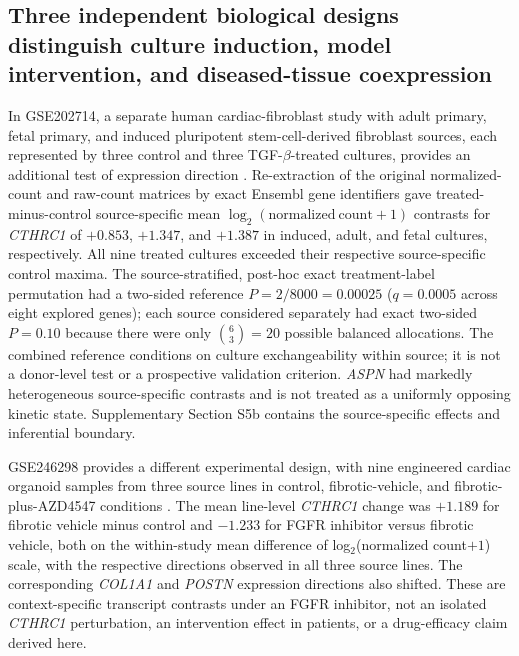 \documentclass[preprint,11pt]{elsarticle}
\newcommand{\cthrc}{\textit{CTHRC1}}
\begin{document}
\subsection{Three independent biological designs distinguish culture induction, model intervention, and diseased-tissue coexpression}
In GSE202714, a separate human cardiac-fibroblast study with adult primary, fetal primary, and induced pluripotent stem-cell-derived fibroblast sources, each represented by three control and three TGF-$\beta$-treated cultures, provides an additional test of expression direction \cite{Moita2022}. Re-extraction of the original normalized-count and raw-count matrices by exact Ensembl gene identifiers gave treated-minus-control source-specific mean \(\log_2(\mathrm{normalized\ count}+1)\) contrasts for \cthrc{} of $+0.853$, $+1.347$, and $+1.387$ in induced, adult, and fetal cultures, respectively. All nine treated cultures exceeded their respective source-specific control maxima. The source-stratified, post-hoc exact treatment-label permutation had a two-sided reference $P=2/8000=0.00025$ ($q=0.0005$ across eight explored genes); each source considered separately had exact two-sided $P=0.10$ because there were only $\binom{6}{3}=20$ possible balanced allocations. The combined reference conditions on culture exchangeability within source; it is not a donor-level test or a prospective validation criterion. \textit{ASPN} had markedly heterogeneous source-specific contrasts and is not treated as a uniformly opposing kinetic state. Supplementary Section S5b contains the source-specific effects and inferential boundary.

GSE246298 provides a different experimental design, with nine engineered cardiac organoid samples from three source lines in control, fibrotic-vehicle, and fibrotic-plus-AZD4547 conditions \cite{Hata2025}. The mean line-level \cthrc{} change was $+1.189$ for fibrotic vehicle minus control and $-1.233$ for FGFR inhibitor versus fibrotic vehicle, both on the within-study mean difference of log$_2$(normalized count$+1$) scale, with the respective directions observed in all three source lines. The corresponding \textit{COL1A1} and \textit{POSTN} expression directions also shifted. These are context-specific transcript contrasts under an FGFR inhibitor, not an isolated \cthrc{} perturbation, an intervention effect in patients, or a drug-efficacy claim derived here.
\end{document}
